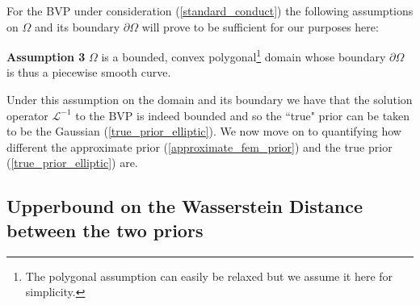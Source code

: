 For the BVP under consideration (\ref{standard_conduct}) the following assumptions on $\Omega$ and its boundary $\partial\Omega$ will prove to be sufficient for our purposes here:

\noindent \textbf{Assumption 3 } $\Omega$ is a bounded, convex polygonal\footnote{The polygonal assumption can easily be relaxed but we assume it here for simplicity.} domain whose boundary $\partial\Omega$ is thus a piecewise smooth curve.

Under this assumption on the domain and its boundary we have that the solution operator $\mathcal{L}^{-1}$ to the BVP is indeed bounded and so the ``true" prior can be taken to be the Gaussian (\ref{true_prior_elliptic}). We now move on to quantifying how different the approximate prior (\ref{approximate_fem_prior}) and the true prior (\ref{true_prior_elliptic}) are.

\subsection{Upperbound on the Wasserstein Distance between the two priors}

